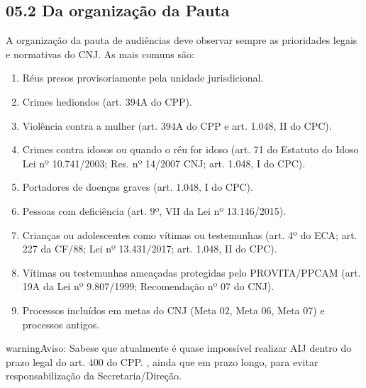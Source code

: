 \documentclass[letterpaper,10pt,brazil]{sphinxmanual}
\begin{document}
\subsection{05.2 \textendash{} Da organização da Pauta}
\label{\detokenize{05pautaraij:da-organizacao-da-pauta}}
\sphinxAtStartPar
A organização da pauta de audiências deve observar sempre as prioridades legais e normativas do CNJ. As mais comuns são:
\begin{enumerate}
%
\item {} 
\sphinxAtStartPar
Réus presos provisoriamente pela unidade jurisdicional.

\item {} 
\sphinxAtStartPar
Crimes hediondos (art. 394\sphinxhyphen{}A do CPP).

\item {} 
\sphinxAtStartPar
Violência contra a mulher (art. 394\sphinxhyphen{}A do CPP e art. 1.048, II do CPC).

\item {} 
\sphinxAtStartPar
Crimes contra idosos ou quando o réu for idoso (art. 71 do Estatuto do Idoso \textendash{} Lei nº 10.741/2003; Res. nº 14/2007 CNJ; art. 1.048, I do CPC).

\item {} 
\sphinxAtStartPar
Portadores de doenças graves (art. 1.048, I do CPC).

\item {} 
\sphinxAtStartPar
Pessoas com deficiência (art. 9º, VII da Lei nº 13.146/2015).

\item {} 
\sphinxAtStartPar
Crianças ou adolescentes como vítimas ou testemunhas (art. 4º do ECA; art. 227 da CF/88; Lei nº 13.431/2017; art. 1.048, II do CPC).

\item {} 
\sphinxAtStartPar
Vítimas ou testemunhas ameaçadas protegidas pelo PROVITA/PPCAM (art. 19\sphinxhyphen{}A da Lei nº 9.807/1999; Recomendação nº 07 do CNJ).

\item {} 
\sphinxAtStartPar
Processos incluídos em metas do CNJ (Meta 02, Meta 06, Meta 07) e processos antigos.

\end{enumerate}

\begin{sphinxadmonition}{warning}{Aviso:}
\sphinxAtStartPar
Sabe\sphinxhyphen{}se que atualmente é quase impossível realizar AIJ dentro do prazo legal do art. 400 do CPP.
, ainda que em prazo longo, para evitar responsabilização da Secretaria/Direção.
\end{sphinxadmonition}
\end{document}
